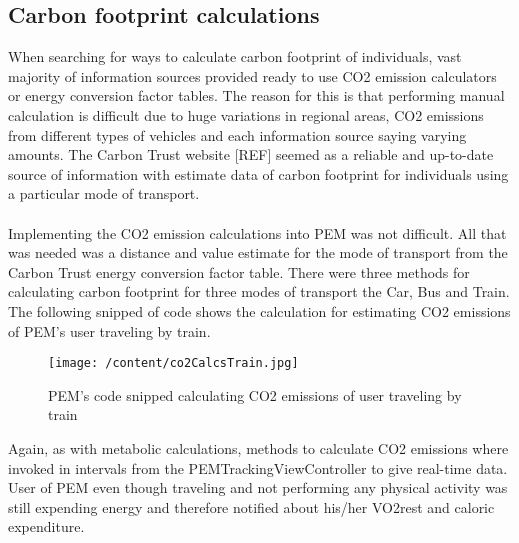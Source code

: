 \documentclass[12pt, a4paper]{report}   %
\begin{document}
\begin{enumerate}
\section{Carbon footprint calculations}
When searching for ways to calculate carbon footprint of individuals, vast majority of information sources provided ready to use CO2 emission calculators or energy conversion factor tables. The reason for this is that performing manual calculation is difficult due to huge variations in regional areas, CO2 emissions from different types of vehicles and each information source saying varying amounts. The Carbon Trust website [REF] seemed as a reliable and up-to-date source of information with estimate data of carbon footprint for individuals using a particular mode of transport.\\ \\
Implementing the CO2 emission calculations into PEM was not difficult. All that was needed was a distance and value estimate for the mode of transport from the Carbon Trust energy conversion factor table. There were three methods for calculating carbon footprint for three modes of transport the Car, Bus and Train. The following snipped of code shows the calculation for estimating CO2 emissions of PEM's user traveling by train.


\begin{figure}[H]
  \centering
	\texttt{[image: /content/co2CalcsTrain.jpg]}
	  \caption{PEM's code snipped calculating CO2 emissions of user traveling by train}
\end{figure}


Again, as with metabolic calculations, methods to calculate CO2 emissions where invoked in intervals from the PEMTrackingViewController to give real-time data.
User of PEM even though traveling and not performing any physical activity was still expending energy and therefore notified about his/her VO2rest and caloric expenditure.\\ \\


\clearpage

\end{enumerate}
\end{document}
